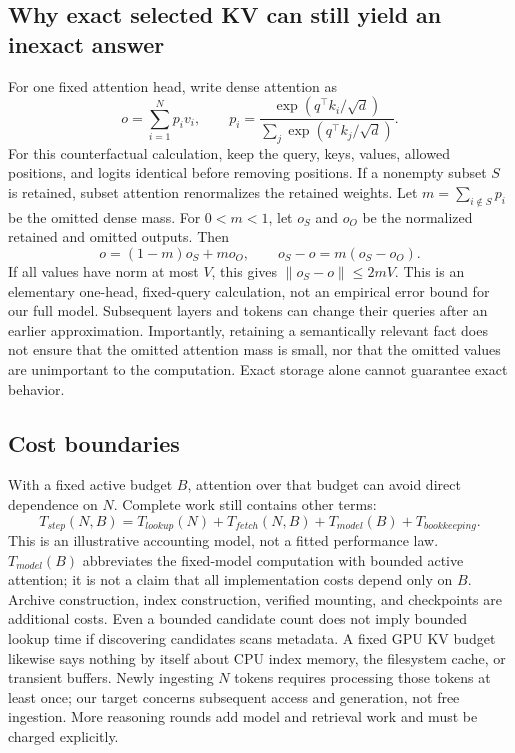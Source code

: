 \documentclass[11pt,letterpaper]{article}
\begin{document}
\subsection{Why exact selected KV can still yield an inexact answer}
For one fixed attention head, write dense attention as
\begin{equation}
o=\sum_{i=1}^{N}p_i v_i,\qquad p_i=\frac{\exp(q^\top k_i/\sqrt d)}{\sum_j\exp(q^\top k_j/\sqrt d)}.
\end{equation}
For this counterfactual calculation, keep the query, keys, values, allowed positions, and logits identical before removing positions. If a nonempty subset $S$ is retained, subset attention renormalizes the retained weights. Let $m=\sum_{i\notin S}p_i$ be the omitted dense mass. For $0<m<1$, let $o_S$ and $o_O$ be the normalized retained and omitted outputs. Then
\begin{equation}
o=(1-m)o_S+mo_O,\qquad o_S-o=m(o_S-o_O).
\end{equation}
If all values have norm at most $V$, this gives $\|o_S-o\|\leq 2mV$. This is an elementary one-head, fixed-query calculation, not an empirical error bound for our full model. Subsequent layers and tokens can change their queries after an earlier approximation. Importantly, retaining a semantically relevant fact does not ensure that the omitted attention mass is small, nor that the omitted values are unimportant to the computation. Exact storage alone cannot guarantee exact behavior.

\subsection{Cost boundaries}
With a fixed active budget $B$, attention over that budget can avoid direct dependence on $N$. Complete work still contains other terms:
\begin{equation}
T_{step}(N,B)=T_{lookup}(N)+T_{fetch}(N,B)+T_{model}(B)+T_{bookkeeping}.
\end{equation}
This is an illustrative accounting model, not a fitted performance law. $T_{model}(B)$ abbreviates the fixed-model computation with bounded active attention; it is not a claim that all implementation costs depend only on $B$. Archive construction, index construction, verified mounting, and checkpoints are additional costs. Even a bounded candidate count does not imply bounded lookup time if discovering candidates scans metadata. A fixed GPU KV budget likewise says nothing by itself about CPU index memory, the filesystem cache, or transient buffers. Newly ingesting $N$ tokens requires processing those tokens at least once; our target concerns subsequent access and generation, not free ingestion. More reasoning rounds add model and retrieval work and must be charged explicitly.
\end{document}
